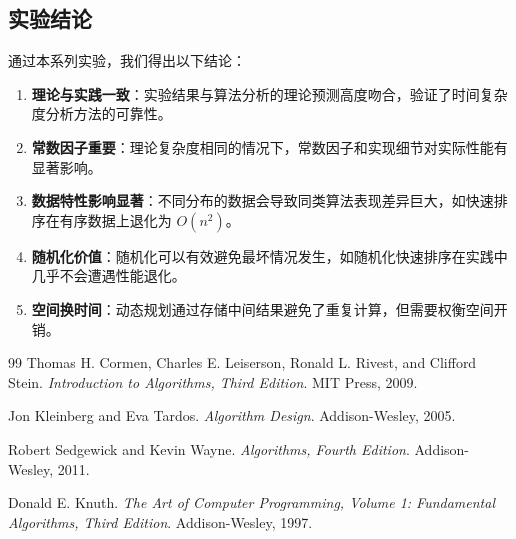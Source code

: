 \documentclass[12pt,a4paper,UTF8]{article}
\begin{document}
\subsection{实验结论}

通过本系列实验，我们得出以下结论：

\begin{enumerate}[label=(\arabic*)]
    \item \textbf{理论与实践一致}：实验结果与算法分析的理论预测高度吻合，验证了时间复杂度分析方法的可靠性。

    \item \textbf{常数因子重要}：理论复杂度相同的情况下，常数因子和实现细节对实际性能有显著影响。

    \item \textbf{数据特性影响显著}：不同分布的数据会导致同类算法表现差异巨大，如快速排序在有序数据上退化为 $O(n^2)$。

    \item \textbf{随机化价值}：随机化可以有效避免最坏情况发生，如随机化快速排序在实践中几乎不会遭遇性能退化。

    \item \textbf{空间换时间}：动态规划通过存储中间结果避免了重复计算，但需要权衡空间开销。
\end{enumerate}

\newpage
{}
\begin{thebibliography}{99}
    Thomas H. Cormen, Charles E. Leiserson, Ronald L. Rivest, and Clifford Stein.
    \newblock \emph{Introduction to Algorithms, Third Edition}.
    \newblock MIT Press, 2009.

    Jon Kleinberg and Eva Tardos.
    \newblock \emph{Algorithm Design}.
    \newblock Addison-Wesley, 2005.

    Robert Sedgewick and Kevin Wayne.
    \newblock \emph{Algorithms, Fourth Edition}.
    \newblock Addison-Wesley, 2011.

    Donald E. Knuth.
    \newblock \emph{The Art of Computer Programming, Volume 1: Fundamental Algorithms, Third Edition}.
    \newblock Addison-Wesley, 1997.
\end{thebibliography}
\end{document}
